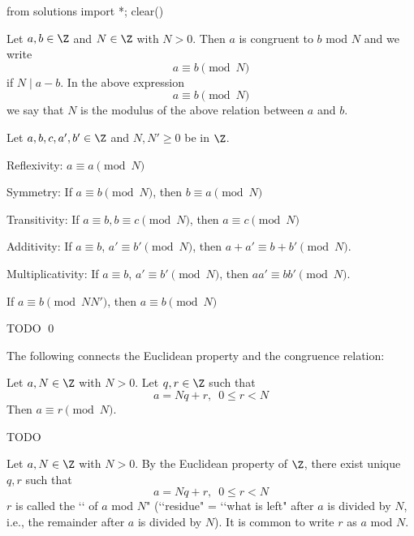 \begin{python0}
from solutions import *; clear()
\end{python0}

\begin{defn}
  Let $a, b \in \Z$ and $N \in \Z$ with $N > 0$.
  Then $a$ is congruent to $b$ mod $N$ and we write
  \[
  a \equiv b \pmod{N}
  \]
  if $N \mid a - b$.
  In the above expression
  \[
  a \equiv b \pmod{N}
  \]
  we say that $N$ is the modulus of the above relation between $a$ and $b$.
\end{defn}

\begin{prop}
  Let $a,b,c,a',b' \in \Z$ and $N,N' \geq 0$ be in $\Z$.
  \begin{myenum}       
  \item \textnormal{Reflexivity:}
    $a \equiv a \pmod{N}$
  \item \textnormal{Symmetry:}
    If $a \equiv b \pmod{N}$, then $b \equiv a \pmod{N}$
  \item \textnormal{Transitivity:}
    If $a \equiv b, b \equiv c \pmod{N}$, then
    $a \equiv c \pmod{N}$
  \item \textnormal{Additivity:}
    If
    $a \equiv b$,
    $a' \equiv b' \pmod{N}$,
    then
    $a + a' \equiv b + b' \pmod{N}$.
  \item \textnormal{Multiplicativity:}
    If
    $a \equiv b$,
    $a' \equiv b' \pmod{N}$,
    then
    $a a' \equiv b b' \pmod{N}$.
  \item
    If
    $a \equiv b \pmod{NN'}$, then
    $a \equiv b \pmod{N}$
  \end{myenum}
\end{prop}
\proof
TODO
\qed

The following connects the Euclidean property and the congruence relation:

\begin{prop}
  Let $a, N \in \Z$ with $N > 0$.
  Let $q, r \in \Z$ such that
  \[
  a = Nq + r, \,\,\, 0 \leq r < N
  \]
  Then $a \equiv r \pmod{N}$.
\end{prop}
\proof
TODO

\begin{defn}
  Let $a, N \in \Z$ with $N > 0$.
  By the Euclidean property of $\Z$, there exist unique $q,r$ such that
  \[
  a = Nq + r, \,\,\, 0 \leq r < N
  \]
  $r$ is called the \lq\lq {} of $a$ mod $N$"
  (\lq\lq residue" = \lq\lq what is left" after $a$ is divided by $N$, i.e.,
  the remainder after $a$ is divided by $N$).
  It is common to write $r$ as $a$ mod $N$.
\end{defn}

